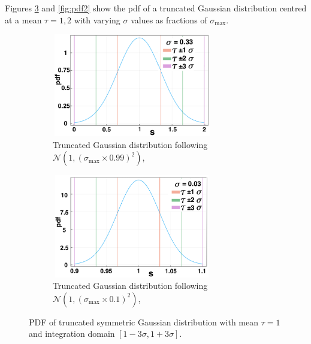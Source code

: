 Figures \ref{fig:pdf1} and \ref{fig:pdf2} show the pdf of a truncated Gaussian distribution centred at a mean $\tau=1,2$ with varying $\sigma$ values as fractions of $\sigma_{\max}$.

\begin{figure}[H]
    \centering
    \begin{subfigure}[t]{0.45\textwidth}
        \centering
        \includegraphics[width=7cm,height=4.5cm]{t1sig1.png}
        \caption{Truncated Gaussian distribution following $\mathcal{N}(1,(\sigma_{\max}\times0.99)^2)$, }
        \label{}
    \end{subfigure}
    \hfill
    \begin{subfigure}[t]{0.45\textwidth}
        \centering
        \includegraphics[width=7cm,height=4.5cm]{t1sig2.png}
        \caption{Truncated Gaussian distribution following $\mathcal{N}(1,(\sigma_{\max}\times0.1)^2)$, }
        \label{}
    \end{subfigure}
\caption{PDF of truncated symmetric Gaussian distribution with mean $\tau=1$ and integration domain $[1-3\sigma,1+3\sigma]$. }
\label{fig:pdf1}
\end{figure}

